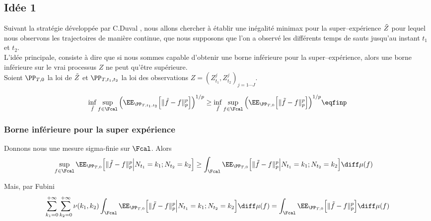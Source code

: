 
\subsection{Idée 1}

Suivant la stratégie développée par C.Duval \cite[Théorème 2.2]{duval2013density}, nous allons chercher à établir une inégalité minimax pour la super--expérience $\Tilde Z$ pour lequel nous observons les trajectoires de manière continue, \ie que nous supposons que l'on a observé les différents temps de sauts jusqu'au instant $t_1$ et $t_2$.  \\
L'idée principale, consiste à dire que si nous sommes capable d'obtenir une borne inférieure pour la super--expérience, alors une borne inférieure sur le vrai processus $Z$ ne peut qu'être supérieure. \\

Soient $\PP_{T,0}$ la loi de $\Tilde Z$ et $\PP_{T,t_1, t_2}$ la loi des observations $Z = (Z_{t_1}^j, Z_{t_2}^j)_{j = 1\cdots J}$. 

\begin{align*}
    \inf_{\hat f} \sup_{f \in \Fcal}  \Big( \EE_{\PP_{T,t_1, t_2}} \Big[  \| \hat f - f \|_p^p  \Big] \Big)^{1/p}
    \geq 
    \inf_{\tilde f} \sup_{f \in \Fcal}  \Big( \EE_{\PP_{T,0}} \Big[  \| \tilde f - f \|_p^p  \Big] \Big)^{1/p}    
    \eqfinp
\end{align*}

\subsubsection{Borne inférieure pour la super expérience}

Donnons nous une mesure sigma-finie sur $\Fcal$.  Alors
\begin{align*}
    \sup_{f \in \Fcal}  \EE_{\PP_{T,0}} \Big[  \| \tilde f - f \|_p^p  \Big| N_{t_1} = k_1; N_{t_2} = k_2 \Big]  
    &\geq
   \int_{\Fcal}  \EE_{\PP_{T,0}} \Big[  \| \tilde f - f \|_p^p  \Big| N_{t_1} = k_1; N_{t_2} = k_2 \Big]  \diff \mu(f)
\end{align*}

Mais, par Fubini
\begin{align*}
   \sum_{k_1 = 0}^{+\infty} \sum_{k_2 = 0}^{+\infty}
   \nu(k_1, k_2) \int_{\Fcal}  \EE_{\PP_{T,0}} \Big[  \| \tilde f - f \|_p^p  \Big| N_{t_1} = k_1; N_{t_2} = k_2 \Big]  \diff \mu(f)
   =
   \int_{\Fcal}  \EE_{\PP_{T,0}} \Big[  \| \tilde f - f \|_p^p \Big]  \diff \mu(f) 
\end{align*}

